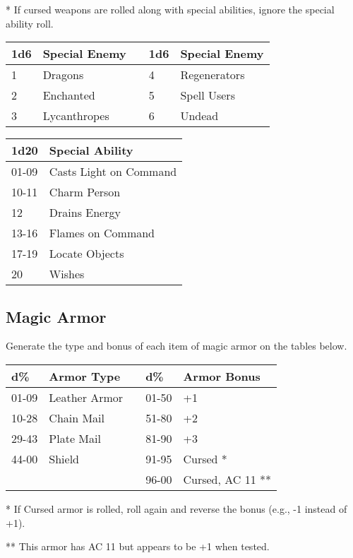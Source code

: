 \documentclass[a4paper,twoside,openany,10pt]{book}
\begin{document}
\begin{multicols}{2}
* If cursed weapons are rolled along with special abilities, ignore the
special ability roll.\medskip

\begin{tabular*}{0.93\linewidth}{@{\extracolsep{\fill}}lllll}
\textbf{1d6} & \textbf{Special Enemy} & & \textbf{1d6} & \textbf{Special Enemy} \\\toprule
1 & Dragons & & 4 & Regenerators \\\hline
2 & Enchanted & & 5 & Spell Users \\\hline
3 & Lycanthropes & & 6 & Undead \\\bottomrule
\end{tabular*}\medskip

\begin{tabular*}{0.93\linewidth}{@{\extracolsep{\fill}}ll}
\textbf{1d20} & \textbf{Special} \textbf{Ability} \\\toprule
01-09 & Casts Light on Command \\\hline
10-11 & Charm Person \\\hline
12 & Drains Energy \\\hline
13-16 & Flames on Command \\\hline
17-19 & Locate Objects \\\hline
20 & Wishes \\\bottomrule
\end{tabular*}

\subsection{Magic Armor}\label{magic-armor}

Generate the type and bonus of each item of magic armor on the tables
below.

\begin{tabular}[]{@{}lllll@{}}
\textbf{d\%} & \textbf{Armor Type} & & \textbf{d\%} & \textbf{Armor Bonus} \\\toprule
01-09 & Leather Armor & & 01-50 & +1 \\\hline
10-28 & Chain Mail & & 51-80 & +2 \\\hline
29-43 & Plate Mail & & 81-90 & +3 \\\hline
44-00 & Shield & & 91-95 & Cursed * \\\hline
& & & 96-00 & Cursed, AC 11 ** \\\bottomrule
\end{tabular}\medskip

* If Cursed armor is rolled, roll again and reverse the bonus (e.g., -1
instead of +1).

** This armor has AC 11 but appears to be +1 when tested.

\end{multicols}
\end{document}
